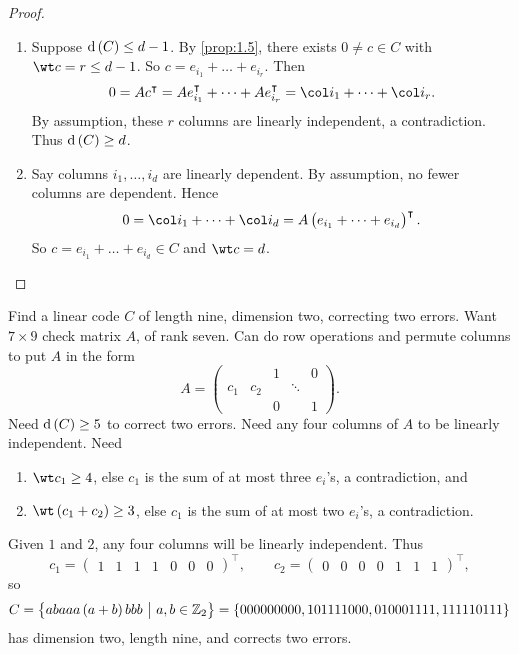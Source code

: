 \begin{proof}
\hfill
\begin{enumerate}
\item Suppose $ \d\br{C} \le d - 1 $. By \ref{prop:1.5}, there exists $ 0 \ne c \in C $ with $ \wt c = r \le d - 1 $. So $ c = e_{i_1} + \dots + e_{i_r} $. Then
$$ 0 = Ac^\intercal = Ae_{i_1}^\intercal + \dots + Ae_{i_r}^\intercal = \col i_1 + \dots + \col i_r. $$
By assumption, these $ r $ columns are linearly independent, a contradiction. Thus $ \d\br{C} \ge d $.
\item Say columns $ i_1, \dots, i_d $ are linearly dependent. By assumption, no fewer columns are dependent. Hence
$$ 0 = \col i_1 + \dots + \col i_d = A\br{e_{i_1} + \dots + e_{i_d}}^\intercal. $$
So $ c = e_{i_1} + \dots + e_{i_d} \in C $ and $ \wt c = d $.
\end{enumerate}
\end{proof}

\pagebreak

\begin{example*}
Find a linear code $ C $ of length nine, dimension two, correcting two errors. Want $ 7 \times 9 $ check matrix $ A $, of rank seven. Can do row operations and permute columns to put $ A $ in the form
$$ A =
\begin{pmatrix}
& & 1 & & 0 \\
c_1 & c_2 & & \ddots & \\
& & 0 & & 1
\end{pmatrix}.
$$
Need $ \d\br{C} \ge 5 $ to correct two errors. Need any four columns of $ A $ to be linearly independent. Need
\begin{enumerate}
\item $ \wt c_1 \ge 4 $, else $ c_1 $ is the sum of at most three $ e_i $'s, a contradiction, and
\item $ \wt \br{c_1 + c_2} \ge 3 $, else $ c_1 $ is the sum of at most two $ e_i $'s, a contradiction.
\end{enumerate}
Given $ 1 $ and $ 2 $, any four columns will be linearly independent. Thus
$$ c_1 =
\begin{pmatrix}
1 & 1 & 1 & 1 & 0 & 0 & 0
\end{pmatrix}^\intercal,
\qquad c_2 =
\begin{pmatrix}
0 & 0 & 0 & 0 & 1 & 1 & 1
\end{pmatrix}^\intercal,
$$
so
$$ C = \cbr{abaaa\br{a + b}bbb \st a, b \in \ZZ_2} = \cbr{000000000, 101111000, 010001111, 111110111} $$
has dimension two, length nine, and corrects two errors.
\end{example*}

